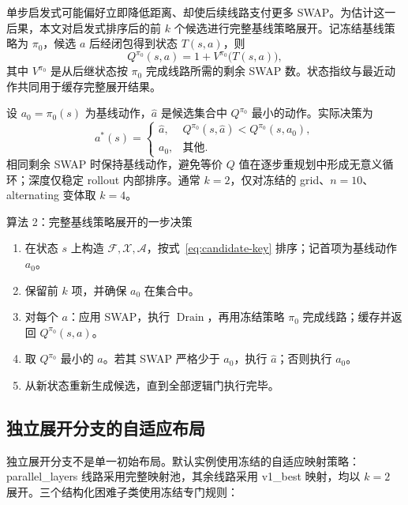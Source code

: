 \documentclass[11pt,a4paper]{article}
\newcommand{\Front}{\mathcal F}
\newcommand{\Extended}{\mathcal X}
\newcommand{\Candidates}{\mathcal A}
\newcommand{\Drain}{\operatorname{Drain}}
\begin{document}
单步启发式可能偏好立即降低距离、却使后续线路支付更多 SWAP。为估计这一后果，本文对启发式排序后的前 $k$ 个候选进行完整基线策略展开。记冻结基线策略为 $\pi_0$，候选 $a$ 后经闭包得到状态 $T(s,a)$，则
\begin{equation}
  Q^{\pi_0}(s,a)
  =1+V^{\pi_0}\bigl(T(s,a)\bigr),
  \label{eq:rollout-q}
\end{equation}
其中 $V^{\pi_0}$ 是从后继状态按 $\pi_0$ 完成线路所需的剩余 SWAP 数。状态指纹与最近动作共同用于缓存完整展开结果。

设 $a_0=\pi_0(s)$ 为基线动作，$\hat a$ 是候选集合中 $Q^{\pi_0}$ 最小的动作。实际决策为
\begin{equation}
  a^*(s)=
  \begin{cases}
    \hat a,&Q^{\pi_0}(s,\hat a)<Q^{\pi_0}(s,a_0),\\
    a_0,&\text{其他}.
  \end{cases}
  \label{eq:strict-improvement}
\end{equation}
相同剩余 SWAP 时保持基线动作，避免等价 $Q$ 值在逐步重规划中形成无意义循环；深度仅稳定 rollout 内部排序。通常 $k=2$，仅对冻结的 grid、$n=10$、alternating 变体取 $k=4$。

\begin{algobox}{算法 2：完整基线策略展开的一步决策}
\begin{enumerate}[label=\arabic*.,leftmargin=2.3em,itemsep=0.18em]
  \item 在状态 $s$ 上构造 $\Front,\Extended,\Candidates$，按式~\eqref{eq:candidate-key} 排序；记首项为基线动作 $a_0$。
  \item 保留前 $k$ 项，并确保 $a_0$ 在集合中。
  \item 对每个 $a$：应用 SWAP，执行 $\Drain$，再用冻结策略 $\pi_0$ 完成线路；缓存并返回 $Q^{\pi_0}(s,a)$。
  \item 取 $Q^{\pi_0}$ 最小的 $\hat a$。若其 SWAP 严格少于 $a_0$，执行 $\hat a$；否则执行 $a_0$。
  \item 从新状态重新生成候选，直到全部逻辑门执行完毕。
\end{enumerate}
\end{algobox}

\subsection{独立展开分支的自适应布局}

独立展开分支不是单一初始布局。默认实例使用冻结的自适应映射策略：parallel\_layers 线路采用完整映射池，其余线路采用 v1\_best 映射，均以 $k=2$ 展开。三个结构化困难子类使用冻结专门规则：
\end{document}
